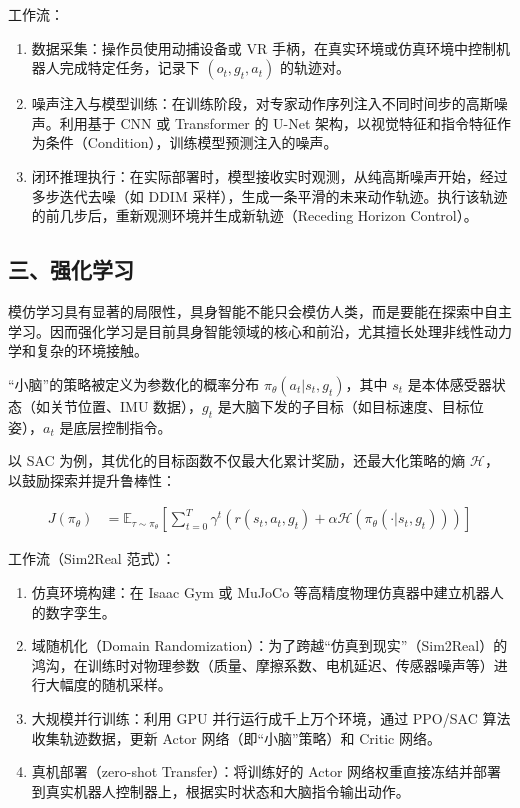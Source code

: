 工作流：

\begin{enumerate}
\def\labelenumi{\arabic{enumi}.}
\tightlist
\item
  数据采集：操作员使用动捕设备或 VR 手柄，在真实环境或仿真环境中控制机器人完成特定任务，记录下 \((o_t,g_t,a_t)\) 的轨迹对。
\item
  噪声注入与模型训练：在训练阶段，对专家动作序列注入不同时间步的高斯噪声。利用基于 CNN 或 Transformer 的 U-Net 架构，以视觉特征和指令特征作为条件（Condition），训练模型预测注入的噪声。
\item
  闭环推理执行：在实际部署时，模型接收实时观测，从纯高斯噪声开始，经过多步迭代去噪（如 DDIM 采样），生成一条平滑的未来动作轨迹。执行该轨迹的前几步后，重新观测环境并生成新轨迹（Receding Horizon Control）。
\end{enumerate}

\hypertarget{ux4e09ux5f3aux5316ux5b66ux4e60}{%
\subsection{三、强化学习}\label{ux4e09ux5f3aux5316ux5b66ux4e60}}

模仿学习具有显著的局限性，具身智能不能只会模仿人类，而是要能在探索中自主学习。因而强化学习是目前具身智能领域的核心和前沿，尤其擅长处理非线性动力学和复杂的环境接触。

``小脑''的策略被定义为参数化的概率分布 \(\pi_\theta(a_t|s_t,g_t)\)，其中 \(s_t\) 是本体感受器状态（如关节位置、IMU 数据），\(g_t\) 是大脑下发的子目标（如目标速度、目标位姿），\(a_t\) 是底层控制指令。

以 SAC 为例，其优化的目标函数不仅最大化累计奖励，还最大化策略的熵 \(\mathcal{H}\)，以鼓励探索并提升鲁棒性：

\[
\begin{aligned}
J(\pi_\theta)
&=
\mathbb{E}_{\tau\sim\pi_\theta}
\left[
\sum_{t=0}^{T}
\gamma^t
\left(
r(s_t,a_t,g_t)+
\alpha\mathcal{H}(\pi_\theta(\cdot|s_t,g_t))
\right)
\right]
\end{aligned}
\]

工作流（Sim2Real 范式）：

\begin{enumerate}
\def\labelenumi{\arabic{enumi}.}
\tightlist
\item
  仿真环境构建：在 Isaac Gym 或 MuJoCo 等高精度物理仿真器中建立机器人的数字孪生。
\item
  域随机化（Domain Randomization）：为了跨越``仿真到现实''（Sim2Real）的鸿沟，在训练时对物理参数（质量、摩擦系数、电机延迟、传感器噪声等）进行大幅度的随机采样。
\item
  大规模并行训练：利用 GPU 并行运行成千上万个环境，通过 PPO/SAC 算法收集轨迹数据，更新 Actor 网络（即``小脑''策略）和 Critic 网络。
\item
  真机部署（zero-shot Transfer）：将训练好的 Actor 网络权重直接冻结并部署到真实机器人控制器上，根据实时状态和大脑指令输出动作。
\end{enumerate}

